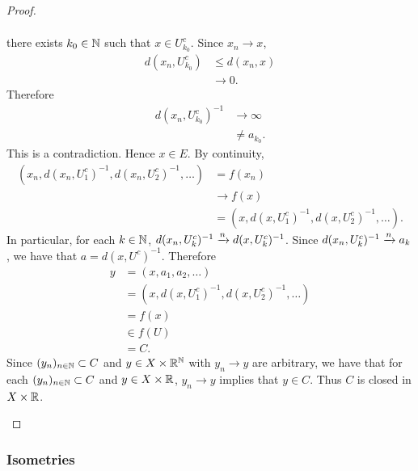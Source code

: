 \documentclass{book}
\begin{document}
\begin{proof}
\begin{enumerate}
\begin{align*}
		\end{align*}
		there exists $k_0 \in \mathbb{N}$ such that $x \in U_{k_0}^c$.
		Since $x_n \rightarrow x$, 
		\begin{align*}
			d(x_n, U^c_{k_0}) 
			& \leq d(x_n, x) \\
			& \rightarrow 0.
		\end{align*}
		Therefore 
		\begin{align*}
			d(x_n, U_{k_0}^c)^{-1} 
			& \rightarrow \infty \\
			& \neq a_{k_0}. 
		\end{align*}
		This is a contradiction. Hence $x \in E$. By continuity,
		\begin{align*}
			(x_n, d(x_n, U^c_1)^{-1}, d(x_n, U^c_2)^{-1}, \ldots) 
			& = f(x_n) \\
			& \rightarrow f(x) \\
			& = (x, d(x, U^c_1)^{-1}, d(x, U^c_2)^{-1}, \ldots).
		\end{align*}
		In particular, for each $k \in \mathbb{N}$, $d(x_n, U^c_k)^{-1} \xrightarrow{n} d(x, U^c_k)^{-1}$. Since $d(x_n, U^c_k)^{-1} \xrightarrow{n} a_k$, we have that $a = d(x, U^c)^{-1}$. Therefore
		\begin{align*}
			y
			& = (x, a_1, a_2, \ldots) \\
			& = (x, d(x, U^c_1)^{-1}, d(x, U^c_2)^{-1}, \ldots) \\
			& = f(x) \\
			& \in f(U) \\
			& = C.
		\end{align*}
		Since $(y_n)_{n \in \mathbb{N}} \subset C$ and $y \in X \times \mathbb{R}^{\mathbb{N}}$ with $y_n \rightarrow y$ are arbitrary, we have that for each $(y_n)_{n \in \mathbb{N}} \subset C$ and $y \in X \times \mathbb{R}$, $y_n \rightarrow y$ implies that $y \in C$. Thus $C$ is closed in $X \times \mathbb{R}$. 
	\end{enumerate}
\end{proof}




























\subsubsection{Isometries}
\end{document}
